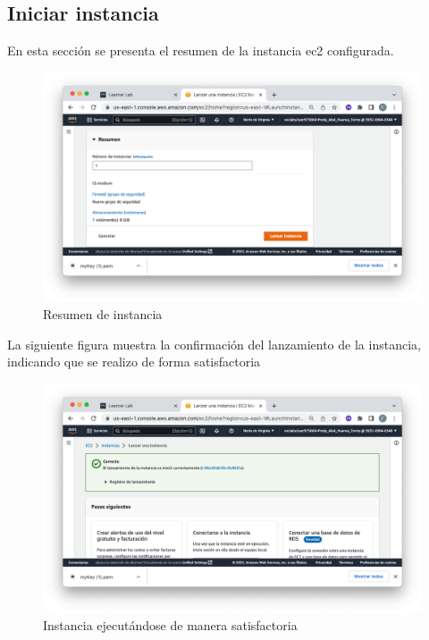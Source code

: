 \clearpage

\subsection{Iniciar instancia}
En esta sección se presenta el resumen de la instancia ec2 configurada.
\begin{figure}[h]
	\centering
	\includegraphics[scale=.35] {img/06}
	\caption{Resumen de instancia}
	\label{fig:6}	
\end{figure}

La siguiente figura muestra la confirmación del lanzamiento de la instancia, indicando que se realizo de forma satisfactoria
\begin{figure}[h]
	\centering
	\includegraphics[scale=.35] {img/07}
	\caption{Instancia ejecutándose de manera satisfactoria}
	\label{fig:7}	
\end{figure}

\clearpage

